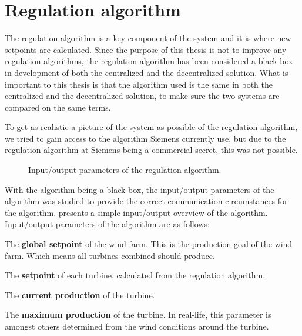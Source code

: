\section{Regulation algorithm}\label{sec:regAlgorithm}

The regulation algorithm is a key component of the system and it is where new setpoints are calculated. Since the purpose of this thesis is not to improve any regulation algorithms, the regulation algorithm has been considered a black box in development of both the centralized and the decentralized solution. What is important to this thesis is that the algorithm used is the same in both the centralized and the decentralized solution, to make sure the two systems are compared on the same terms. 

To get as realistic a picture of the system as possible of the regulation algorithm, we tried to gain access to the algorithm Siemens currently use, but due to the regulation algorithm at Siemens being a commercial secret, this was not possible.

\begin{figure}
	\centering
	

	\caption[Regulation algorithm input/output parameters]{
		\label{fig:ioRegAlg} 
		\footnotesize{%
			Input/output parameters of the regulation algorithm.
		}
	}
\end{figure}

With the algorithm being a black box, the input/output parameters of the algorithm was studied to provide the correct communication circumstances for the algorithm.  presents a simple input/output overview of the algorithm. Input/output parameters of the algorithm are as follows:

\begin{description}
	\item The \textbf{global setpoint} of the wind farm. This is the production goal of the wind farm. Which means all turbines combined should produce.
	\item The \textbf{setpoint} of each turbine, calculated from the regulation algorithm. 
	\item The \textbf{current production} of the turbine.
	\item The \textbf{maximum production} of the turbine. In real-life, this parameter is amongst others determined from the wind conditions around the turbine.
\end{description}

